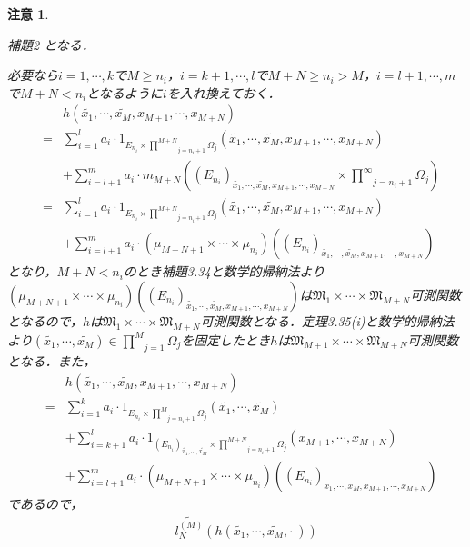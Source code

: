 \documentclass[a4paper,11pt]{jsarticle}
\newtheorem{attention}{注意}
\begin{document}
\begin{attention}
\begin{itembox}[l]{補題2}
となる．
\end{itembox}
必要なら$i=1,\cdots,k$で$M\geq n_i$，$i=k+1,\cdots,l$で$M+N\geq n_i>M$，$i=l+1,\cdots,m$で$M+N<n_i$となるように$i$を入れ換えておく．
\begin{eqnarray*}
&&h(\widetilde{x_1},\cdots,\widetilde{x_M},x_{M+1},\cdots,x_{M+N}) \\
&=&\sum_{i=1}^la_i\cdot 1_{E_{n_i}\times\underset{j=n_i+1}{\overset{M+N}{\prod}}\Omega_j}(\widetilde{x_1},\cdots,\widetilde{x_M},x_{M+1},\cdots,x_{M+N}) \\
&&+\sum_{i=l+1}^m a_i \cdot m_{M+N}\left((E_{n_i})_{\widetilde{x_1},\cdots,\widetilde{x_M},x_{M+1},\cdots,x_{M+N}}\times\underset{j=n_i+1}{\overset{\infty}{\prod}}\Omega_j\right) \\
&=&\sum_{i=1}^la_i\cdot 1_{E_{n_i}\times\underset{j=n_i+1}{\overset{M+N}{\prod}}\Omega_j}(\widetilde{x_1},\cdots,\widetilde{x_M},x_{M+1},\cdots,x_{M+N}) \\
&&+\sum_{i=l+1}^m a_i \cdot(\mu_{M+N+1}\times\cdots\times\mu_{n_i})\left((E_{n_i})_{\widetilde{x_1},\cdots,\widetilde{x_M},x_{M+1},\cdots,x_{M+N}}\right)
\end{eqnarray*}
となり，$M+N<n_i$のとき補題3.34と数学的帰納法より$(\mu_{M+N+1}\times\cdots\times\mu_{n_i})\left((E_{n_i})_{\widetilde{x_1},\cdots,\widetilde{x_M},x_{M+1},\cdots,x_{M+N}}\right)$は$\mathfrak{M}_1\times\cdots\times\mathfrak{M}_{M+N}$可測関数となるので，$h$は$\mathfrak{M}_1\times\cdots\times\mathfrak{M}_{M+N}$可測関数となる．定理3.35(i)と数学的帰納法より$(\widetilde{x_1},\cdots,\widetilde{x_M})\in\underset{j=1}{\overset{M}{\prod}}\Omega_j$を固定したとき$h$は$\mathfrak{M}_{M+1}\times\cdots\times\mathfrak{M}_{M+N}$可測関数となる．また，
\begin{eqnarray*}
&&h(\widetilde{x_1},\cdots,\widetilde{x_M},x_{M+1},\cdots,x_{M+N}) \\
&=&\sum_{i=1}^ka_i\cdot 1_{E_{n_i}\times\underset{j=n_i+1}{\overset{M}{\prod}}\Omega_j}(\widetilde{x_1},\cdots,\widetilde{x_M}) \\
&&+\sum_{i=k+1}^la_i\cdot 1_{(E_{n_i})_{\widetilde{x_1},\cdots,\widetilde{x_M}}\times\underset{j=n_i+1}{\overset{M+N}{\prod}}\Omega_j}(x_{M+1},\cdots,x_{M+N}) \\
&&+\sum_{i=l+1}^m a_i \cdot(\mu_{M+N+1}\times\cdots\times\mu_{n_i})\left((E_{n_i})_{\widetilde{x_1},\cdots,\widetilde{x_M},x_{M+1},\cdots,x_{M+N}}\right)
\end{eqnarray*}
であるので，
\begin{eqnarray*}
&&\widetilde{l^{(M)}_N}(h(\widetilde{x_1},\cdots,\widetilde{x_M},\cdot{\ })) \\

\end{eqnarray*}
\end{attention}
\end{document}
